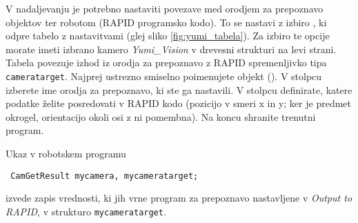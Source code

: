 V nadaljevanju je potrebno nastaviti povezave med orodjem za prepoznavo objektov ter robotom (RAPID programsko kodo). To se nastavi z izbiro , ki odpre tabelo z nastavitvami (glej sliko \ref{fig:yumi_tabela}). Za izbiro te opcije morate imeti izbrano kamero \emph{Yumi\_Vision} v drevesni strukturi na levi strani.  Tabela povezuje izhod iz orodja za prepoznavo z RAPID spremenljivko tipa \verb"cameratarget". Najprej ustrezno smiselno poimenujete objekt (). V stolpcu  izberete ime orodja za prepoznavo, ki ste ga nastavili. V stolpcu  definirate, katere podatke želite posredovati v RAPID kodo (pozicijo v smeri x in y; ker je predmet okrogel, orientacijo okoli osi z ni pomembna). Na koncu shranite trenutni program.



Ukaz v robotskem programu
\begin{verbatim}
 CamGetResult mycamera, mycameratarget;
\end{verbatim}
izvede zapis vrednosti, ki jih vrne program za prepoznavo nastavljene v \emph{Output to RAPID}, v strukturo \newline \verb"mycameratarget".


\vspace{5mm}

